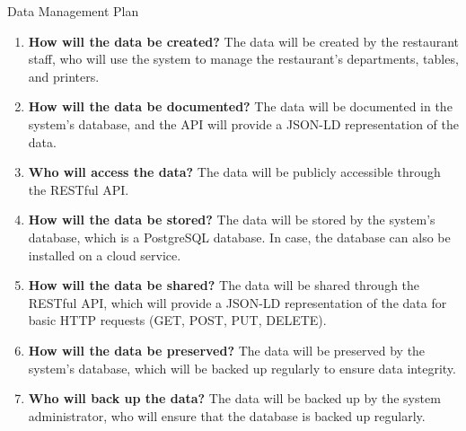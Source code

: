 \begin{frame}[allowframebreaks]{Data Management Plan}

	\begin{enumerate}
		\item \textbf{How will the data be created?} The data will be created by the
		      restaurant staff, who will use the system to manage the restaurant's
		      departments, tables, and printers.
		\item \textbf{How will the data be documented?} The data will be documented in
		      the system's database, and the API will provide a JSON-LD representation of
		      the data.
		\item \textbf{Who will access the data?} The data will be publicly accessible
		      through the RESTful API.
		\item \textbf{How will the data be stored?} The data will be stored by the
		      system's database, which is a PostgreSQL database. In case, the database
			  can also be installed on a cloud service.
		\item \textbf{How will the data be shared?} The data will be shared through the
		      RESTful API, which will provide a JSON-LD representation of the data for
			  basic HTTP requests (GET, POST, PUT, DELETE).
		\item \textbf{How will the data be preserved?} The data will be preserved by
		      the system's database, which will be backed up regularly to ensure data
			  integrity.
		\item \textbf{Who will back up the data?} The data will be backed up by the
		      system administrator, who will ensure that the database is backed up
			  regularly.
	\end{enumerate}
\end{frame}
